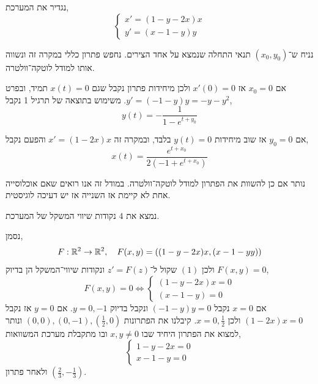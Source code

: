 \question{}
נגדיר את המערכת,
\[
	\begin{cases}
		x' = (1 - y - 2x) x \\
		y' = (x - 1 - y) y
	\end{cases}
	\tag{1}
\]

\subquestion{}
נניח ש־$(x_0, y_0)$ תנאי התחלה שנמצא על אחד הצירים.
נחפש פתרון כללי במקרה זה ונשווה אותו למודל לוטקה־וולטרה.
\begin{solution}
	אם $x_0 = 0$ אז $x'(0) = 0$ ולכן מיחידות פתרון נקבל שגם $x(t) = 0$ תמיד, ובפרט $y' = (-1 -y) y = -y - y^2$.
	משימוש בתוצאה של תרגיל 1 נקבל,
	\[
		y(t)
		= -\frac{1}{1 - e^{t + y_0}}
	\]

	אם $y_0 = 0$ אז שוב מיחידות $y(t) = 0$ בלבד, ובמקרה זה $x' = (1 - 2x) x$ והפעם נקבל,
	\[
		x(t)
		= \frac{e^{t + x_0}}{2(-1 + e^{t + x_0})}
	\]

	נותר אם כן להשוות את הפתרון למודל לוטקה־וולטרה.
	במודל זה אנו רואים שאם אוכלוסייה אחת לא קיימת אז השנייה אז יש דעיכה לוגיסטית.
\end{solution}

\subquestion{}
נמצא את $4$ נקודות שיווי המשקל של המערכת.
\begin{solution}
	נסמן,
	\[
		F : \mathbb{R}^2 \to \mathbb{R}^2,
		\quad
		F(x, y)
		= ((1 - y - 2x) x, (x - 1 - y y))
	\]
	ולכן $(1)$ שקול ל־$z' = F(z)$ ונקודות שיווי־המשקל הן בדיוק $F(x, y) = 0$,
	\[
		F(x, y) = 0
		\iff \begin{cases}
			(1 - y - 2x) x = 0 \\
			(x - 1 - y) = 0
		\end{cases}
	\]
	אם $x = 0$ נקבל $(-1 - y) y = 0$ ונקבל בדיוק $y = 0, -1$.
	אם $y = 0$ אז נקבל $(1 - 2x) x = 0$ ולכן $x = 0, \frac{1}{2}$.
	קיבלנו את הפתרונות $(0, 0), (0, -1), (\frac{1}{2}, 0)$ ונותר למצוא את הפתרון היחיד שבו $x, y \ne 0$ ובו מתקבלת מערכת המשוואות,
	\[
		\begin{cases}
			1 - y - 2x = 0 \\
			x - 1 - y = 0
		\end{cases}
	\]
	ולאחר פתרון $(\frac{2}{3}, -\frac{1}{3})$.
\end{solution}

